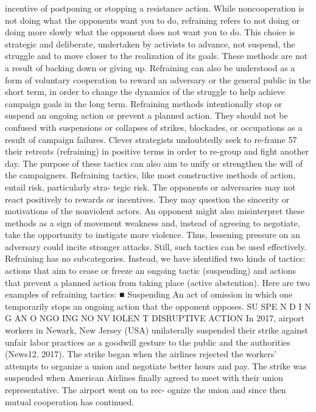 \documentclass[twoside,a4paper,12pt,fleqn,openany]{extbook}
\begin{document}
incentive of postponing or stopping a resistance action. While noncooperation is not doing
what the opponents want you to do, refraining refers to not doing or doing more slowly what
the opponent does not want you to do. This choice is strategic and deliberate, undertaken
by activists to advance, not suspend, the struggle and to move closer to the realization of its
goals. These methods are not a result of backing down or giving up. Refraining can also be
understood as a form of voluntary cooperation to reward an adversary or the general public
in the short term, in order to change the dynamics of the struggle to help achieve campaign
goals in the long term.
Refraining methods intentionally stop or suspend an ongoing action or prevent a planned
action. They should not be confused with suspensions or collapses of strikes, blockades, or
occupations as a result of campaign failures. Clever strategists undoubtedly seek to re-frame
57
their retreats (refraining) in positive terms in order to re-group and fight another day. The
purpose of these tactics can also aim to unify or strengthen the will of the campaigners.
Refraining tactics, like most constructive methods of action, entail risk, particularly stra-
tegic risk. The opponents or adversaries may not react positively to rewards or incentives.
They may question the sincerity or motivations of the nonviolent actors. An opponent might
also misinterpret these methods as a sign of movement weakness and, instead of agreeing
to negotiate, take the opportunity to instigate more violence. Thus, lessening pressure on
an adversary could incite stronger attacks. Still, such tactics can be used effectively.
Refraining has no subcategories. Instead, we have identified two kinds of tactics: actions
that aim to cease or freeze an ongoing tactic (suspending) and actions that prevent a planned
action from taking place (active abstention). Here are two examples of refraining tactics:
■ Suspending
An act of omission in which one temporarily stops an ongoing action that the opponent
opposes.
SU SPE N D I N G AN O NGO ING NO NV IOLEN T DISRUPTIVE ACTION
In 2017, airport workers in Newark, New Jersey (USA) unilaterally suspended their strike
against unfair labor practices as a goodwill gesture to the public and the authorities (News12,
2017). The strike began when the airlines rejected the workers’ attempts to organize a
union and negotiate better hours and pay. The strike was suspended when American
Airlines finally agreed to meet with their union representative. The airport went on to rec-
ognize the union and since then mutual cooperation has continued.
\end{document}
